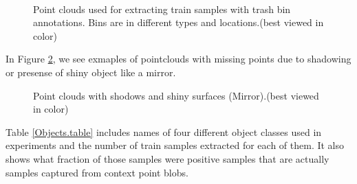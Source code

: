 \begin{figure} [htp]
     \begin{center}
    \\
    \end{center}
  \caption[Train set pointclouds]
  {Point clouds used for extracting train samples with trash bin annotations. Bins are in different types and locations.(best viewed in color)}
  \label{TrainClouds1.figure:edge}
\end{figure}

In Figure \ref{TrainClouds1Challenge.figure:edge}, we see exmaples of pointclouds with missing points due to shadowing or presense of shiny object like a mirror. 

\begin{figure} [htp]
    \begin{center}
   \end{center}
  \caption[Challenges with some pointclouds]
  {Point clouds with shodows and shiny surfaces (Mirror).(best viewed in color)}
  \label{TrainClouds1Challenge.figure:edge}
\end{figure}



Table \ref{Objects.table} includes names of four different object classes used in experiments and the number of train samples extracted for each of them.
It also shows what fraction of those samples were positive samples that are actually samples captured from context point blobs.


